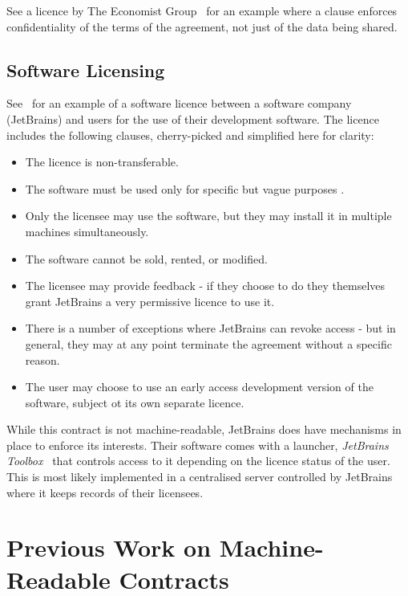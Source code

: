 See a licence by The Economist Group~\cite[]{economistIU2016licence} for an example
where a clause enforces confidentiality of the terms of the agreement, not just of the data
being shared.

\subsection{Software Licensing}\label{subsec:licensing:software}
See~\cite{jetbrainsEduLicence} for an example of a software licence between a software company (JetBrains) and users for
the use of their development software.
The licence includes the following clauses, cherry-picked and simplified here for clarity:
\begin{itemize}
    \item The licence is non-transferable.
    \item The software must be used only for specific but vague purposes \textcite[for non-commercial, educational purposes
    only]{jetbrainsEduLicence}.
    \item Only the licensee may use the software, but they may install it in multiple machines simultaneously.
    \item The software cannot be sold, rented, or modified.
    \item The licensee may provide feedback - if they choose to do they themselves grant JetBrains a very permissive
    licence to use it.
    \item There is a number of exceptions where JetBrains can revoke access - but in general, they may at any point
    terminate the agreement without a specific reason.
    \item The user may choose to use an early access development version of the software, subject ot its own separate
    licence.
\end{itemize}

While this contract is not machine-readable, JetBrains does have mechanisms in place to enforce its interests.
Their software comes with a launcher, \textit{JetBrains Toolbox}~\cite{jetbrainsToolbox} that controls access to it
depending on the licence status of the user.
This is most likely implemented in a centralised server controlled by JetBrains where it keeps records
of their licensees.


\section{Previous Work on Machine-Readable Contracts}\label{sec:machine-readable-contracts}

